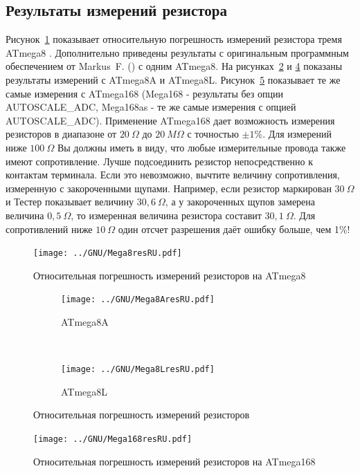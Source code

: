 \subsection{Результаты измерений резистора}
Рисунок~\ref{fig:mega8res} показывает относительную погрешность измерений резистора тремя ATmega8 . Дополнительно 
приведены результаты с оригинальным программным обеспечением от Markus~F. () с одним ATmega8. На 
рисунках~\ref{fig:mega8Ares} и \ref{fig:mega8Lres} показаны результаты измерений с ATmega8A и ATmega8L. 
Рисунок~\ref{fig:mega168res} показывает те же самые измерения с ATmega168 (Mega168 - результаты без опции 
AUTOSCALE\_ADC, Mega168as - те же самые измерения с опцией AUTOSCALE\_ADC). Применение ATmega168 дает возможность 
измерения резисторов в диапазоне от \(20~\Omega\) до \(20~M\Omega\) с точностью \(\pm1\%\).
Для измерений ниже \(100~\Omega\) Вы должны иметь в виду, что любые измерительные провода также имеют сопротивление. 
Лучше подсоединить резистор непосредственно к контактам терминала. Если это невозможно, вычтите величину 
сопротивления, измеренную с закороченными щупами. Например, если резистор маркирован \(30~\Omega\) и Тестер 
показывает величину \(30,6~\Omega\),
а у закороченных щупов замерена величина \(0,5~\Omega\), то измеренная величина резистора составит \(30,1~\Omega\).
Для сопротивлений ниже \(10~\Omega\) один отсчет  разрешения даёт ошибку больше, чем 1\%!

\begin{figure}[H]
\centering
\texttt{[image: ../GNU/Mega8resRU.pdf]}
\caption{Относительная погрешность измерений резисторов на ATmega8 }
\label{fig:mega8res}
\end{figure}

\begin{figure}[H]
  \begin{subfigure}[b]{.5\textwidth}
    \centering
    \texttt{[image: ../GNU/Mega8AresRU.pdf]}
    \caption{ATmega8A}
    \label{fig:mega8Ares}
  \end{subfigure}
  ~
  \begin{subfigure}[b]{.5\textwidth}
    \centering
    \texttt{[image: ../GNU/Mega8LresRU.pdf]}
    \caption{ATmega8L}
    \label{fig:mega8Lres}
  \end{subfigure}
\caption{Относительная погрешность измерений резисторов}
\end{figure}


\begin{figure}[H]
\centering
\texttt{[image: ../GNU/Mega168resRU.pdf]}
\caption{Относительная погрешность измерений резисторов на ATmega168 }
\label{fig:mega168res}
\end{figure}

